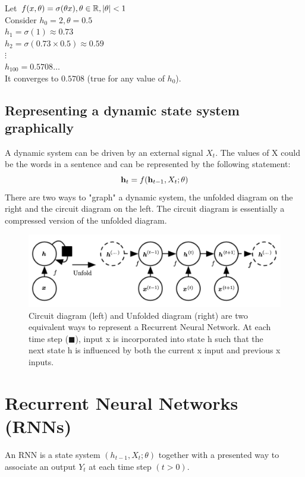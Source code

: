 \begin{example} 
Let $f(x,\theta) = \sigma(\theta x),  \theta \in \R,  |\theta| < 1$\\
Consider $h_0=2, \theta=0.5$\\
$h_1 = \sigma(1) \approx 0.73$\\
$h_2 = \sigma(0.73 \times 0.5 ) \approx 0.59$\\
$\vdots$\\
$h_{100} = 0.5708 \ldots$\\
It converges to $0.5708$  (true for any value of $h_0$).
\end{example} 
\subsection{Representing a dynamic state system graphically} A dynamic system can be driven by an external signal $X_t$. The values of X could be the words in a sentence and can be represented by the following statement:
$$\vh_t=f(\vh_{t-1}, X_t; \theta)$$
There are two ways to "graph" a dynamic system, the unfolded diagram on the right and the circuit diagram on the left. The circuit diagram is essentially a compressed version of the unfolded diagram.

\begin{figure}[H]
    \centering
    \includegraphics[scale=0.25]{images/Chapter12/circuit_and_unfolded_diagram.png}
    \caption{Circuit diagram (left) and Unfolded diagram (right) are two equivalent ways to represent a Recurrent Neural Network. At each time step ($\blacksquare$), input x is incorporated into state h such that the next state h is influenced by both the current x input and previous x inputs.}
    \label{fig:12.1}
\end{figure}
\section{Recurrent Neural Networks (RNNs)}

An RNN is a state system $(h_{t-1}, X_t; \theta)$ together with a presented way to associate an output $Y_t$ at each time step $(t>0)$.

